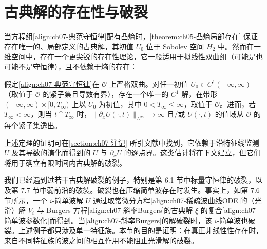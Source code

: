\documentclass[../../main.tex]{subfiles}
\begin{document}
\section{古典解的存在性与破裂}\label{section:ch07-古典解破裂}

当方程组\eqref{align:ch07-典范守恒律}配有凸熵时，\cref{theorem:ch05-凸熵局部存在}
保证存在唯一的、局部定义的古典解，其初值 $U_0$ 位于 Sobolev 空间 $H_2$ 中。然而在一维空间中，存在一个更尖锐的存在性理论，它一般适用于拟线性双曲组（可能是也可能不是守恒律），且不依赖于熵的存在：

\begin{theorem}\label{theorem:ch07-局部存在与破裂}
假定\eqref{align:ch07-典范守恒律}在 $\mathscr{O}$ 上严格双曲。对任一初值 $U_0\in C^1(-\infty,\infty)$（取值于 $\mathscr{O}$ 的紧子集且导数有界），存在一个唯一的 $C^1$ 解，在带形 $(-\infty,\infty)\times[0,T_\infty)$ 上以 $U_0$ 为初值，其中 $0<T_\infty\leqslant\infty$，取值于 $\mathscr{O}$。进而，若 $T_\infty<\infty$，则当 $t\uparrow T_\infty$ 时，$\|\partial_x U(\cdot,t)\|_{L^\infty}\to\infty$ 且/或 $U(\cdot,t)$ 的值域从 $\mathscr{O}$ 的每个紧子集逸出。
\end{theorem}

上述定理的证明可在\cref{section:ch07-注记}
所引文献中找到，它依赖于沿特征线监测 $U$ 及其导数的演化而得到的 $U$ 与 $\partial_x U$ 的逐点界。这类估计将在下文建立，但它们将用于确立有限时间内古典解的破裂。

我们已经遇到过若干古典解破裂的例子，特别是第 6.1 节中标量守恒律的破裂，以及第 7.7 节中弱前沿的破裂。破裂也在压缩简单波存在时发生。事实上，如第 7.6 节所示，一个 $i$-简单波解 $U$ 通过取常微分方程\eqref{align:ch07-稀疏波曲线ODE}的（光滑）解 $V_i$ 与 Burgers 方程\eqref{align:ch07-斜率Burgers}的古典解 $\xi$ 的复合\eqref{align:ch07-简单波参数化}而得到。当\eqref{align:ch07-斜率Burgers}的解破裂时，该 $i$-简单波也破裂。上述例子都只涉及单一特征族。本节的目的是证明：在真正非线性性存在时，来自不同特征族的波之间的相互作用不能阻止光滑解的破裂。
\end{document}

